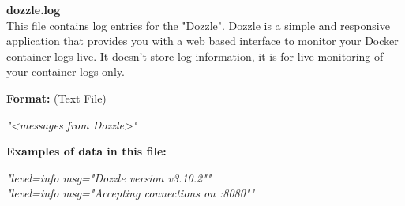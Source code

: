 \begin{description}
\begin{addmargin}[0em]{0em}
    \label{dozzle.log}
    \begin{addmargin}[1em]{0em} %
        \textbf{dozzle.log}\\
        This file contains log entries for the "Dozzle".
        Dozzle is a simple and responsive application that provides you with a web based interface to monitor your Docker container logs live.
        It doesn't store log information, it is for live monitoring of your container logs only.
        \begin{addmargin}[1em]{0em}
            \textbf{Format:} (Text File)
            \begin{addmargin}[1em]{0em}
                \textit{"<messages from Dozzle>"}
            \end{addmargin}
        \end{addmargin}
        \begin{addmargin}[1em]{0em}
            \textbf{Examples of data in this file:}
            \begin{addmargin}[1em]{0em}\textit{"level=info msg="Dozzle version v3.10.2""\\
                "level=info msg="Accepting connections on :8080""}
            \end{addmargin}
        \end{addmargin}
    \end{addmargin} %
    \textbf{\\}


\end{addmargin}
\end{description}
